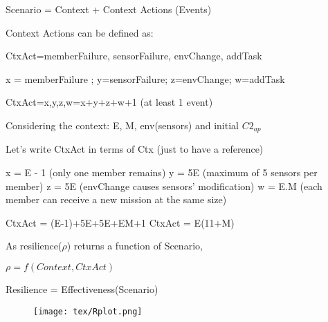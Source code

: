 
Scenario = Context + Context Actions (Events)

Context Actions can be defined as:

CtxAct={memberFailure, sensorFailure, envChange, addTask}

x = memberFailure ; y=sensorFailure; z=envChange; w=addTask

CtxAct={x,y,z,w}=x+y+z+w+1 (at least 1 event)

Considering the context: E, M, env(sensors) and initial $C2_{ap}$ 

Let's write CtxAct in terms of Ctx (just to have a reference)

x = E - 1 (only one member remains)
y = 5E (maximum of 5 sensors per member)
z = 5E (envChange causes sensors' modification)
w = E.M (each member can receive a new mission at the same size)

CtxAct = (E-1)+5E+5E+EM+1
CtxAct = E(11+M) 

As resilience($\rho$) returns a function of Scenario,

$\rho = f(Context, CtxAct)$

Resilience = Effectiveness(Scenario)

\begin{figure}
    \centering
    \texttt{[image: tex/Rplot.png]}
\end{figure}